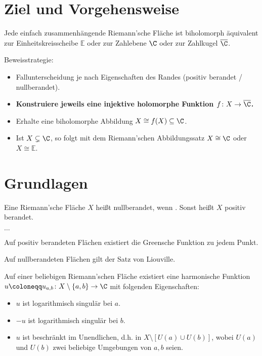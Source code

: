 \documentclass{article}
\newcommand{\E}{\mathbb{E}}
\begin{document}
        \section{Ziel und Vorgehensweise}
        \begin{satz}[Uniformisierungssatz]
            Jede einfach zusammenhängende Riemann’sche Fläche ist biholomorph äquivalent zur Einheitskreisscheibe $\E$ oder zur Zahlebene $\C$ oder zur Zahlkugel $\overline{\C}$.
        \end{satz}
        Beweisstrategie: 
        \begin{itemize}
            \item Fallunterscheidung je nach Eigenschaften des Randes (positiv berandet / nullberandet).
            \item \textbf{Konstruiere jeweils eine injektive holomorphe Funktion $f\colon X \to \overline{\C}$.}
            \item Erhalte eine biholomorphe Abbildung $X \cong f(X) \subseteq \C$. 
            \item Ist $X \subsetneq \C$, so folgt mit dem Riemann’schen Abbildungssatz $X \cong \C$ oder $X\cong \E$.
        \end{itemize}

        \section{Grundlagen}
        \begin{definition}
            Eine Riemann’sche Fläche $X$ heißt nullberandet, wenn . Sonst heißt $X$ positiv berandet.
        \end{definition}
        \begin{definition}
            $\dots$
        \end{definition}
        \begin{lemma}
            Auf positiv berandeten Flächen existiert die Greensche Funktion zu jedem Punkt.
        \end{lemma}
        \begin{lemma}
            Auf nullberandeten Flächen gilt der Satz von Liouville.
        \end{lemma}
        \begin{lemma}
            Auf einer beliebigen Riemann’schen Fläche existiert eine harmonische Funktion $u \coloneqq u_{a,b} \colon X \setminus \{a, b\} \to \C$ mit folgenden Eigenschaften:
            \begin{itemize}
                \item $u$ ist logarithmisch singulär bei $a$.
                \item $-u$ ist logarithmisch singulär bei $b$.
                \item $u$ ist beschränkt im Unendlichen, d.h. in $X \setminus [U (a) \cup U (b)]$, wobei $U(a)$ und $U(b)$ zwei beliebige Umgebungen von $a, b$ seien.
            \end{itemize}
        \end{lemma}
\end{document}
